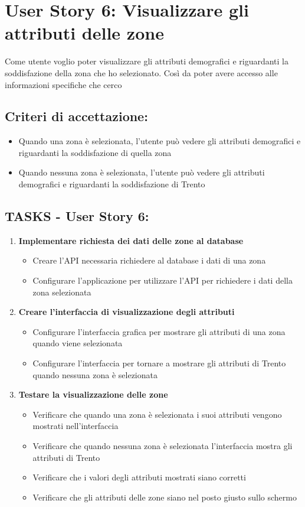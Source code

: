 \section*{User Story 6: Visualizzare gli attributi delle zone}
    Come utente voglio poter visualizzare gli attributi demografici e riguardanti la soddisfazione della zona che ho selezionato. Così da poter avere accesso alle informazioni specifiche che cerco
    \subsection*{Criteri di accettazione:}  
    \begin{itemize}  
        \item Quando una zona è selezionata, l'utente può vedere gli attributi demografici e riguardanti la soddisfazione di quella zona
        \item Quando nessuna zona è selezionata, l'utente può vedere gli attributi demografici e riguardanti la soddisfazione di Trento
    \end{itemize}  
    \subsection*{TASKS - User Story 6:}  
    \begin{enumerate}  
        \item \textbf{Implementare richiesta dei dati delle zone al database}  
            \begin{itemize}  
                \item Creare l'API necessaria richiedere al database i dati di una zona
                \item Configurare l'applicazione per utilizzare l'API per richiedere i dati della zona selezionata
            \end{itemize}
        \item \textbf{Creare l'interfaccia di visualizzazione degli attributi}  
            \begin{itemize}  
                \item Configurare l'interfaccia grafica per mostrare gli attributi di una zona quando viene selezionata
                \item Configurare l'interfaccia per tornare a mostrare gli attributi di Trento quando nessuna zona è selezionata
            \end{itemize}  
        \item \textbf{Testare la visualizzazione delle zone}  
            \begin{itemize}  
                \item Verificare che quando una zona è selezionata i suoi attributi vengono mostrati nell'interfaccia
                \item Verificare che quando nessuna zona è selezionata l'interfaccia mostra gli attributi di Trento
                \item Verificare che i valori degli attributi mostrati siano corretti
                \item Verificare che gli attributi delle zone siano nel posto giusto sullo schermo
            \end{itemize} 
    \end{enumerate}
